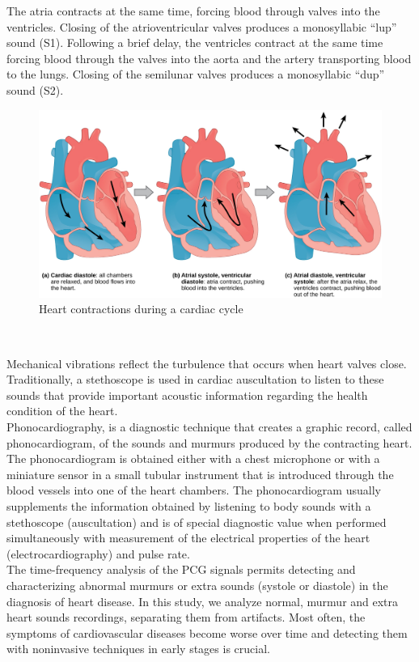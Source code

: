 \documentclass[11pt, a4papper]{report}
\theoremstyle{plain}
\theoremstyle{definition}
\theoremstyle{definition}
\theoremstyle{proposition}
\begin{document}
The atria contracts at the same time, forcing blood through valves into the ventricles. Closing of the atrioventricular valves produces a monosyllabic “lup” sound (S1). Following a brief delay, the ventricles contract at the same time forcing blood through the valves into the aorta and the artery transporting blood to the lungs. Closing of the semilunar valves produces a monosyllabic “dup” sound (S2). 
\\

\begin{figure}[h]
\includegraphics[width=14cm]{heart.jpg}
\centering
\caption{Heart contractions during a cardiac cycle}
\end{figure}
\

Mechanical vibrations reflect the turbulence that occurs when heart valves close. Traditionally, a stethoscope is used in cardiac auscultation to listen to these sounds that provide important acoustic information regarding the health condition of the heart. \cite{4}
\\

Phonocardiography, is a diagnostic technique that creates a graphic record, called phonocardiogram, of the sounds and murmurs produced by the contracting heart. The phonocardiogram is obtained either with a chest microphone or with a miniature sensor in a small tubular instrument that is introduced through the blood vessels into one of the heart chambers. The phonocardiogram usually supplements the information obtained by listening to body sounds with a stethoscope (auscultation) and is of special diagnostic value when performed simultaneously with measurement of the electrical properties of the heart (electrocardiography) and pulse rate.\cite{6}
\\

The time-frequency analysis of the PCG signals permits detecting and characterizing abnormal murmurs or extra sounds (systole or diastole) in the diagnosis of heart disease. In this study, we analyze normal, murmur and extra heart sounds recordings, separating them from artifacts. Most often, the symptoms of cardiovascular diseases become worse over time and detecting them with noninvasive techniques in early stages is crucial.
\\
\end{document}
